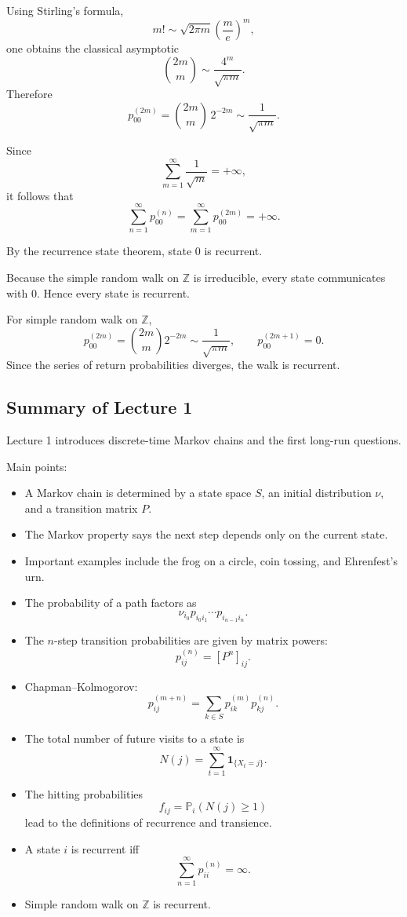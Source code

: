 \documentclass[11pt]{article}
\theoremstyle{definition}
\begin{document}
Using Stirling's formula,
\[
m!\sim \sqrt{2\pi m}\left(\frac{m}{e}\right)^m,
\]
one obtains the classical asymptotic
\[
\binom{2m}{m}\sim \frac{4^m}{\sqrt{\pi m}}.
\]
Therefore
\[
p_{00}^{(2m)}
=
\binom{2m}{m}\,2^{-2m}
\sim \frac{1}{\sqrt{\pi m}}.
\]

Since
\[
\sum_{m=1}^{\infty}\frac{1}{\sqrt{m}}=+\infty,
\]
it follows that
\[
\sum_{n=1}^{\infty} p_{00}^{(n)}
=
\sum_{m=1}^{\infty} p_{00}^{(2m)}
=+\infty.
\]

By the recurrence state theorem, state \(0\) is recurrent.

Because the simple random walk on \(\mathbb Z\) is irreducible, every state communicates with \(0\). Hence every state is recurrent.

\begin{summarybox}
For simple random walk on \(\mathbb Z\),
\[
p_{00}^{(2m)}=\binom{2m}{m}2^{-2m}\sim \frac{1}{\sqrt{\pi m}},
\qquad
p_{00}^{(2m+1)}=0.
\]
Since the series of return probabilities diverges, the walk is recurrent.
\end{summarybox}

\subsection{Summary of Lecture 1}

\begin{summarybox}
Lecture 1 introduces discrete-time Markov chains and the first long-run questions.

Main points:
\begin{itemize}[leftmargin=2em]
    \item A Markov chain is determined by a state space \(S\), an initial distribution \(\nu\), and a transition matrix \(P\).
    \item The Markov property says the next step depends only on the current state.
    \item Important examples include the frog on a circle, coin tossing, and Ehrenfest's urn.
    \item The probability of a path factors as
    \[
    \nu_{i_0}p_{i_0i_1}\cdots p_{i_{n-1}i_n}.
    \]
    \item The \(n\)-step transition probabilities are given by matrix powers:
    \[
    p_{ij}^{(n)}=[P^n]_{ij}.
    \]
    \item Chapman--Kolmogorov:
    \[
    p_{ij}^{(m+n)}=\sum_{k\in S}p_{ik}^{(m)}p_{kj}^{(n)}.
    \]
    \item The total number of future visits to a state is
    \[
    N(j)=\sum_{t=1}^{\infty}\mathbf 1_{\{X_t=j\}}.
    \]
    \item The hitting probabilities
    \[
    f_{ij}=\mathbb P_i(N(j)\ge 1)
    \]
    lead to the definitions of recurrence and transience.
    \item A state \(i\) is recurrent iff
    \[
    \sum_{n=1}^{\infty} p_{ii}^{(n)}=\infty.
    \]
    \item Simple random walk on \(\mathbb Z\) is recurrent.
\end{itemize}
\end{summarybox}
\end{document}
